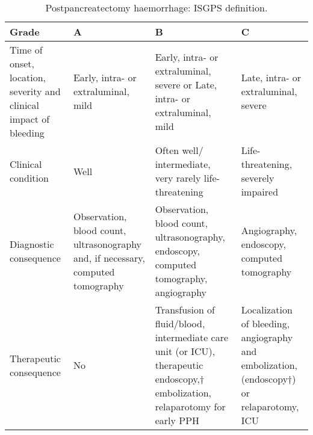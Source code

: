 \begin{sidewaystable}[htbp]
\caption{Postpancreatectomy haemorrhage: ISGPS definition.}
\label{table:isgps_pph}
\begin{tabular}{|m{4.5cm}|m{4cm}|m{5cm}|m{5cm}|}
	\hline
	Grade                                                             & A                                                                                & B                                                                                                                             & C                                                                                         \\ \hline
	Time of onset, location, severity and clinical impact of bleeding & Early, intra- or extraluminal, mild                                              & Early, intra- or extraluminal, severe	or Late, intra- or extraluminal, mild                                                   & Late, intra- or extraluminal, severe                                                      \\
	Clinical condition                                                & Well                                                                             & Often well/ intermediate, very rarely life-threatening                                                                        & Life-threatening, severely impaired                                                      \\
	Diagnostic consequence                                            & Observation, blood count, ultrasonography and, if necessary, computed tomography & Observation, blood count, ultrasonography, endoscopy, computed tomography, angiography                                      & Angiography, endoscopy, computed tomography                                              \\
	Therapeutic consequence                                           & No                                                                               & Transfusion of fluid/blood, intermediate care unit (or ICU), therapeutic endoscopy,† embolization, relaparotomy for early PPH & Localization of bleeding, angiography and embolization, (endoscopy†) or relaparotomy, ICU \\ \hline
\end{tabular}
\end{sidewaystable}